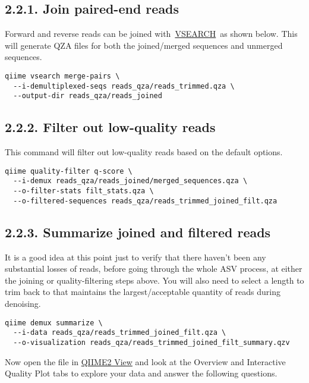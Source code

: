 \documentclass[
]{book}
\begin{document}
\subsection{2.2.1. Join paired-end reads}\label{join-paired-end-reads-1}

Forward and reverse reads can be joined with~\href{https://github.com/torognes/vsearch}{VSEARCH}~as shown below. This will generate QZA files for both the joined/merged sequences and unmerged sequences.

\begin{verbatim}
qiime vsearch merge-pairs \
  --i-demultiplexed-seqs reads_qza/reads_trimmed.qza \
  --output-dir reads_qza/reads_joined
\end{verbatim}

\subsection{2.2.2. Filter out low-quality reads}\label{filter-out-low-quality-reads-1}

This command will filter out low-quality reads based on the default options.

\begin{verbatim}
qiime quality-filter q-score \
  --i-demux reads_qza/reads_joined/merged_sequences.qza \
  --o-filter-stats filt_stats.qza \
  --o-filtered-sequences reads_qza/reads_trimmed_joined_filt.qza
\end{verbatim}

\subsection{2.2.3. Summarize joined and filtered reads}\label{summarize-joined-and-filtered-reads-1}

It is a good idea at this point just to verify that there haven't been any substantial losses of reads, before going through the whole ASV process, at either the joining or quality-filtering steps above. You will also need to select a length to trim back to that maintains the largest/acceptable quantity of reads during denoising.

\begin{verbatim}
qiime demux summarize \
  --i-data reads_qza/reads_trimmed_joined_filt.qza \
  --o-visualization reads_qza/reads_trimmed_joined_filt_summary.qzv
\end{verbatim}

Now open the file in \href{https://view.qiime2.org/}{QIIME2 View} and look at the Overview and Interactive Quality Plot tabs to explore your data and answer the following questions.
\end{document}
